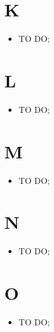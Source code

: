 %


\section*{K} %
\label{sec:k}
	\begin{itemize}
		\item TO DO;
	\end{itemize}

\section*{L} %
\label{sec:l}
	\begin{itemize}
		\item TO DO;
	\end{itemize}

\section*{M} %
\label{sec:m}
	\begin{itemize}
		\item TO DO;
	\end{itemize}

\section*{N} %
\label{sec:n}
	\begin{itemize}
		\item TO DO;
	\end{itemize}

\section*{O} %
\label{sec:o}
	\begin{itemize}
		\item TO DO;
	\end{itemize}
